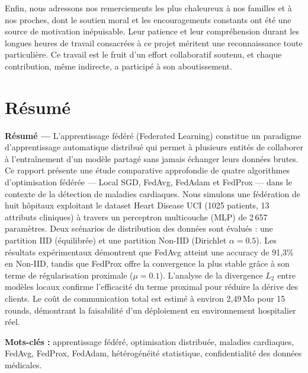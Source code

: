\documentclass[12pt,a4paper]{report}
\begin{document}
Enfin, nous adressons nos remerciements les plus chaleureux \`{a} nos familles et \`{a} nos proches, dont le soutien moral et les encouragements constants ont \'{e}t\'{e} une source de motivation in\'{e}puisable. Leur patience et leur compr\'{e}hension durant les longues heures de travail consacr\'{e}es \`{a} ce projet m\'{e}ritent une reconnaissance toute particuli\`{e}re. Ce travail est le fruit d'un effort collaboratif soutenu, et chaque contribution, m\^{e}me indirecte, a particip\'{e} \`{a} son aboutissement.

\chapter*{R\'{e}sum\'{e}}

\textbf{R\'{e}sum\'{e} ---} L'apprentissage f\'{e}d\'{e}r\'{e} (Federated Learning) constitue un paradigme d'apprentissage automatique distribu\'{e} qui permet \`{a} plusieurs entit\'{e}s de collaborer \`{a} l'entra\^{i}nement d'un mod\`{e}le partag\'{e} sans jamais \'{e}changer leurs donn\'{e}es brutes. Ce rapport pr\'{e}sente une \'{e}tude comparative approfondie de quatre algorithmes d'optimisation f\'{e}d\'{e}r\'{e}e --- Local SGD, FedAvg, FedAdam et FedProx --- dans le contexte de la d\'{e}tection de maladies cardiaques. Nous simulons une f\'{e}d\'{e}ration de huit h\^{o}pitaux exploitant le dataset Heart Disease UCI (1025 patients, 13 attributs cliniques) \`{a} travers un perceptron multicouche (MLP) de 2\,657 param\`{e}tres. Deux sc\'{e}narios de distribution des donn\'{e}es sont \'{e}valu\'{e}s : une partition IID (\'{e}quilibr\'{e}e) et une partition Non-IID (Dirichlet $\alpha = 0.5$). Les r\'{e}sultats exp\'{e}rimentaux d\'{e}montrent que FedAvg atteint une accuracy de 91,3\% en Non-IID, tandis que FedProx offre la convergence la plus stable gr\^{a}ce \`{a} son terme de r\'{e}gularisation proximale ($\mu = 0.1$). L'analyse de la divergence $L_2$ entre mod\`{e}les locaux confirme l'efficacit\'{e} du terme proximal pour r\'{e}duire la d\'{e}rive des clients. Le co\^{u}t de communication total est estim\'{e} \`{a} environ 2,49\,Mo pour 15 rounds, d\'{e}montrant la faisabilit\'{e} d'un d\'{e}ploiement en environnement hospitalier r\'{e}el.

\textbf{Mots-cl\'{e}s :} apprentissage f\'{e}d\'{e}r\'{e}, optimisation distribu\'{e}e, maladies cardiaques, FedAvg, FedProx, FedAdam, h\'{e}t\'{e}rog\'{e}n\'{e}it\'{e} statistique, confidentialit\'{e} des donn\'{e}es m\'{e}dicales.
\end{document}
